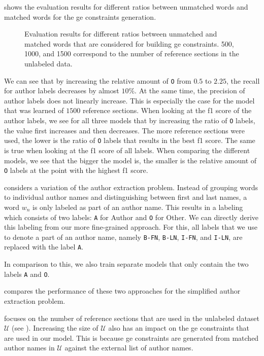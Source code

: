  shows the evaluation results for different ratios between unmatched words and matched words for the \gls{ge} constraints generation.
\begin{figure}[t]

\caption{Evaluation results for different ratios between unmatched and matched words that are considered for building \gls{ge} constraints. 500, 1000, and 1500 correspond to the number of reference sections in the unlabeled data.}
\end{figure}
We can see that by increasing the relative amount of \texttt{O} from $0.5$ to $2.25$, the \gls{recall} for author labels decreases by almost $10\%$.
At the same time, the \gls{precision} of author labels does not linearly increase.
This is especially the case for the model that was learned of $1500$ reference sections.
When looking at the \gls{f1 score} of the author labels, we see for all three models that by increasing the ratio of \texttt{O} labels, the value first increases and then decreases.
The more reference sections were used, the lower is the ratio of \texttt{O} labels that results in the best \gls{f1 score}.
The same is true when looking at the \gls{f1 score} of all labels.
When comparing the different models, we see that the bigger the model is, the smaller is the relative amount of \texttt{O} labels at the point with the highest \gls{f1 score}.

\bigskip

 considers a variation of the author extraction problem.
Instead of grouping words to individual author names and distinguishing between first and last names, a word $w_n$ is only labeled as part of an author name.
This results in a labeling which consists of two labels:
\texttt{A} for Author and \texttt{O} for Other.
We can directly derive this labeling from our more fine-grained approach.
For this, all labels that we use to denote a part of an author name, namely \texttt{B-FN}, \texttt{B-LN}, \texttt{I-FN}, and \texttt{I-LN}, are replaced with the label \texttt{A}.

In comparison to this, we also train separate models that only contain the two labels \texttt{A} and \texttt{O}.

 compares the performance of these two approaches for the simplified author extraction problem.

\bigskip

 focuses on the number of reference sections that are used in the unlabeled dataset $\mathcal{U}$ (see ).
Increasing the size of $\mathcal{U}$ also has an impact on the \gls{ge} constraints that are used in our model.
This is because \gls{ge} constraints are generated from matched author names in $\mathcal{U}$ against the external list of author names.

